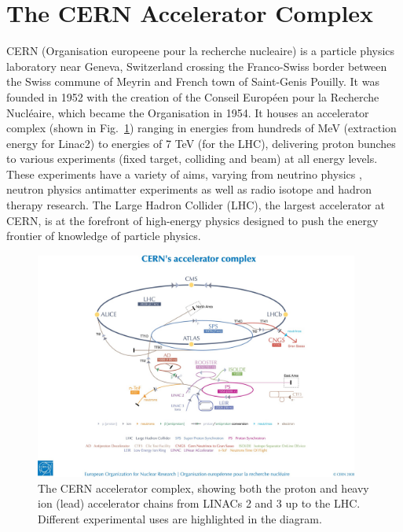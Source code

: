 \section{The CERN Accelerator Complex}

CERN (Organisation europeene pour la recherche nucleaire) is a particle physics laboratory near Geneva, Switzerland crossing the Franco-Swiss border between the Swiss commune of Meyrin and French town of Saint-Genis Pouilly. It was founded in 1952 with the creation of the Conseil Europ\'{e}en pour la Recherche Nucl\'{e}aire, which became the Organisation in 1954. It houses an accelerator complex (shown in Fig.~\ref{fig:CERN-acc-complex}) ranging in energies from hundreds of MeV (extraction energy for Linac2) to energies of 7 TeV (for the LHC), delivering proton bunches to various experiments (fixed target, colliding and beam) at all energy levels. These experiments have a variety of aims, varying from neutrino physics \cite{Bailey:CNGS}, neutron physics \cite{ntof} antimatter experiments \cite{Gabrielse:ATRAP,Hori:ASACUSA,Hangst:ALPHA} as well as radio isotope \cite{Kadi:ISOLDE} and hadron therapy \cite{Maggiore:ACE} research. The Large Hadron Collider (LHC), the largest accelerator at CERN, is at the forefront of high-energy physics designed to push the energy frontier of knowledge of particle physics.

\begin{figure}
\begin{center}
\includegraphics[width=0.95\textwidth]{Introduction/figures/cernaccelerators.jpg}
\end{center}
\caption{The CERN accelerator complex, showing both the proton and heavy ion (lead) accelerator chains from LINACs 2 and 3 up to the LHC. Different experimental uses are highlighted in the diagram.}
\label{fig:CERN-acc-complex}
\end{figure}

